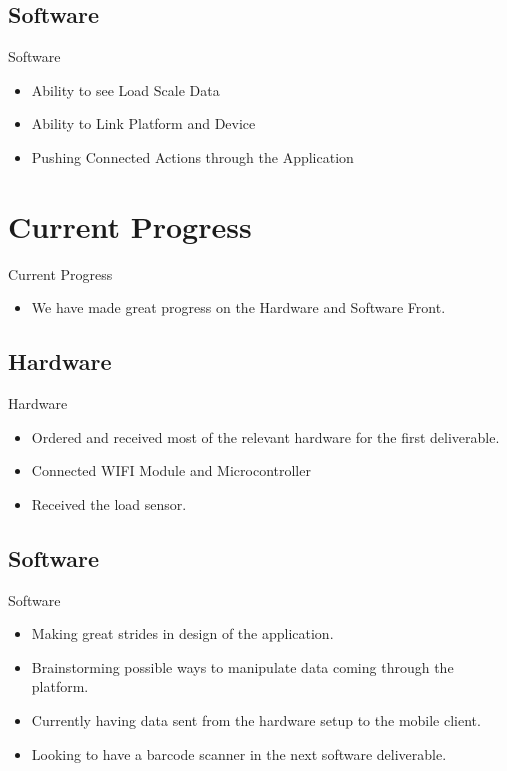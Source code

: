 \documentclass{beamer}
\begin{document}
\subsection{Software}
\begin{frame}{Software}
\begin{itemize}
	\item<1-> Ability to see Load Scale Data \pause
	\item<2-> Ability to Link Platform and Device \pause
	\item<3-> Pushing Connected Actions through the Application
\end{itemize}
\end{frame}

\section{Current Progress}
\begin{frame}{Current Progress}
\begin{itemize}
	\item<1-> We have made great progress on the Hardware and Software Front.
\end{itemize}
\end{frame}
\subsection{Hardware}
\begin{frame}{Hardware}
\begin{itemize}
	\item<1-> Ordered and received most of the relevant hardware for the first deliverable.\pause
	\item<2-> Connected WIFI Module and Microcontroller\pause
	\item<3-> Received the load sensor.
\end{itemize}
\end{frame}
\subsection{Software}
\begin{frame}{Software}
\begin{itemize}
	\item<1-> Making great strides in design of the application. \pause
	\item<2-> Brainstorming possible ways to manipulate data coming through the platform. \pause
	\item<3-> Currently having data sent from the hardware setup to the mobile client.  \pause
	\item<4-> Looking to have a barcode scanner in the next software deliverable. 
\end{itemize}
\end{frame}
\end{document}
